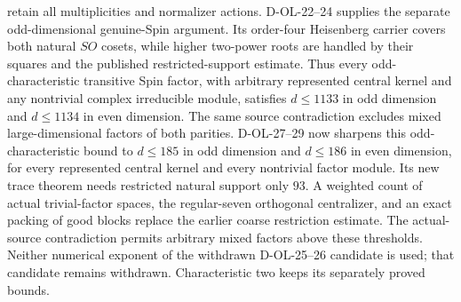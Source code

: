 \documentclass[11pt]{article}
\theoremstyle{remark}\newtheorem{remark}[theorem]{Remark}
\begin{document}
retain all multiplicities and normalizer actions. D-OL-22--24 supplies the separate odd-dimensional genuine-Spin
argument. Its order-four Heisenberg carrier covers both natural
$SO$ cosets, while higher two-power roots are handled by their
squares and the published restricted-support estimate. Thus
every odd-characteristic transitive Spin factor, with arbitrary
represented central kernel and any nontrivial complex irreducible
module, satisfies $d\le1133$ in odd dimension and $d\le1134$
in even dimension. The same source contradiction excludes mixed
large-dimensional factors of both parities.
D-OL-27--29 now sharpens this odd-characteristic bound to
$d\le185$ in odd dimension and $d\le186$ in even dimension,
for every represented central kernel and every nontrivial factor
module. Its new trace theorem needs restricted natural support
only $93$. A weighted count of actual trivial-factor spaces,
the regular-seven orthogonal centralizer, and an exact packing
of good blocks replace the earlier coarse restriction estimate.
The actual-source contradiction permits arbitrary mixed factors
above these thresholds. Neither numerical exponent of the
withdrawn D-OL-25--26 candidate is used; that candidate remains
withdrawn. Characteristic two keeps its separately proved bounds.
\end{document}
